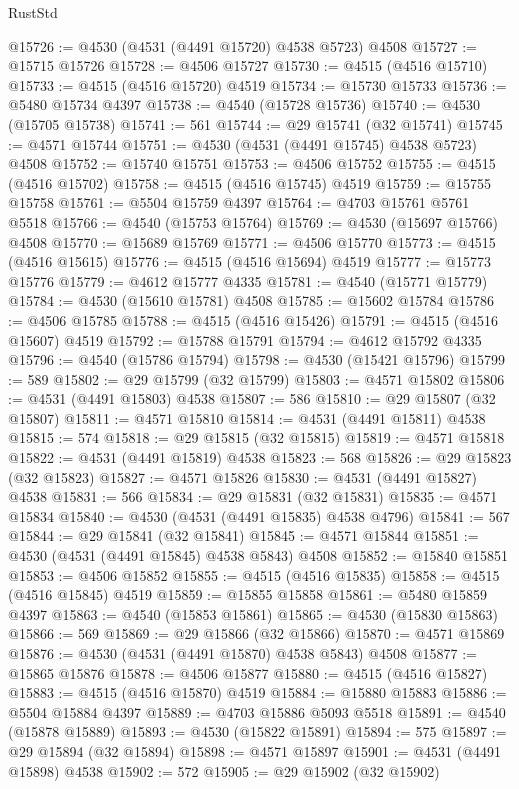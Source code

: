 \begin{lexlean}{RustStd}
\begin{coremodule}
{\begin{coremodule}
{{{{{{{{{{{{{{{{{{{{{{{{{{{{{{{{{{{{{{{{{{{{{{{{{{{{{{{@15726 := @4530 (@4531 (@4491 @15720) @4538 @5723) @4508
@15727 := @15715 @15726
@15728 := @4506 @15727
@15730 := @4515 (@4516 @15710)
@15733 := @4515 (@4516 @15720) @4519
@15734 := @15730 @15733
@15736 := @5480 @15734 @4397
@15738 := @4540 (@15728 @15736)
@15740 := @4530 (@15705 @15738)
@15741 := 561
@15744 := @29 @15741 (@32 @15741)
@15745 := @4571 @15744
@15751 := @4530 (@4531 (@4491 @15745) @4538 @5723) @4508
@15752 := @15740 @15751
@15753 := @4506 @15752
@15755 := @4515 (@4516 @15702)
@15758 := @4515 (@4516 @15745) @4519
@15759 := @15755 @15758
@15761 := @5504 @15759 @4397
@15764 := @4703 @15761 @5761 @5518
@15766 := @4540 (@15753 @15764)
@15769 := @4530 (@15697 @15766) @4508
@15770 := @15689 @15769
@15771 := @4506 @15770
@15773 := @4515 (@4516 @15615)
@15776 := @4515 (@4516 @15694) @4519
@15777 := @15773 @15776
@15779 := @4612 @15777 @4335
@15781 := @4540 (@15771 @15779)
@15784 := @4530 (@15610 @15781) @4508
@15785 := @15602 @15784
@15786 := @4506 @15785
@15788 := @4515 (@4516 @15426)
@15791 := @4515 (@4516 @15607) @4519
@15792 := @15788 @15791
@15794 := @4612 @15792 @4335
@15796 := @4540 (@15786 @15794)
@15798 := @4530 (@15421 @15796)
@15799 := 589
@15802 := @29 @15799 (@32 @15799)
@15803 := @4571 @15802
@15806 := @4531 (@4491 @15803) @4538
@15807 := 586
@15810 := @29 @15807 (@32 @15807)
@15811 := @4571 @15810
@15814 := @4531 (@4491 @15811) @4538
@15815 := 574
@15818 := @29 @15815 (@32 @15815)
@15819 := @4571 @15818
@15822 := @4531 (@4491 @15819) @4538
@15823 := 568
@15826 := @29 @15823 (@32 @15823)
@15827 := @4571 @15826
@15830 := @4531 (@4491 @15827) @4538
@15831 := 566
@15834 := @29 @15831 (@32 @15831)
@15835 := @4571 @15834
@15840 := @4530 (@4531 (@4491 @15835) @4538 @4796)
@15841 := 567
@15844 := @29 @15841 (@32 @15841)
@15845 := @4571 @15844
@15851 := @4530 (@4531 (@4491 @15845) @4538 @5843) @4508
@15852 := @15840 @15851
@15853 := @4506 @15852
@15855 := @4515 (@4516 @15835)
@15858 := @4515 (@4516 @15845) @4519
@15859 := @15855 @15858
@15861 := @5480 @15859 @4397
@15863 := @4540 (@15853 @15861)
@15865 := @4530 (@15830 @15863)
@15866 := 569
@15869 := @29 @15866 (@32 @15866)
@15870 := @4571 @15869
@15876 := @4530 (@4531 (@4491 @15870) @4538 @5843) @4508
@15877 := @15865 @15876
@15878 := @4506 @15877
@15880 := @4515 (@4516 @15827)
@15883 := @4515 (@4516 @15870) @4519
@15884 := @15880 @15883
@15886 := @5504 @15884 @4397
@15889 := @4703 @15886 @5093 @5518
@15891 := @4540 (@15878 @15889)
@15893 := @4530 (@15822 @15891)
@15894 := 575
@15897 := @29 @15894 (@32 @15894)
@15898 := @4571 @15897
@15901 := @4531 (@4491 @15898) @4538
@15902 := 572
@15905 := @29 @15902 (@32 @15902)
}}}}}}}}}}}}}}}}}}}}}}}}}}}}}}}}}}}}}}}}}}}}}}}}}}}}}}}
\end{coremodule}}
\end{coremodule}
\end{lexlean}

